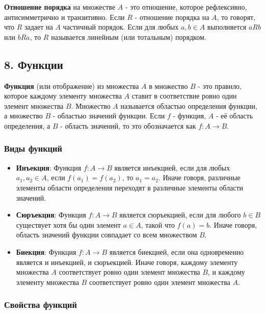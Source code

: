 \documentclass{article}
\begin{document}
\textbf{Отношение порядка} на множестве \( A \) - это отношение, которое рефлексивно, антисимметрично и транзитивно. Если \( R \) - отношение порядка на \( A \), то говорят, что \( R \) задает на \( A \) частичный порядок. Если для любых \( a, b \in A \) выполняется \( a R b \) или \( b R a \), то \( R \) называется линейным (или тотальным) порядком.

\subsection*{8. Функции}

\textbf{Функция} (или отображение) из множества \( A \) в множество \( B \) - это правило, которое каждому элементу множества \( A \) ставит в соответствие ровно один элемент множества \( B \). Множество \( A \) называется областью определения функции, а множество \( B \) - областью значений функции. Если \( f \) - функция, \( A \) - её область определения, а \( B \) - область значений, то это обозначается как \( f: A \to B \).

\subsubsection*{Виды функций}
\begin{itemize}
    \item \textbf{Инъекция}: Функция \( f: A \to B \) является инъекцией, если для любых \( a_1, a_2 \in A \), если \( f(a_1) = f(a_2) \), то \( a_1 = a_2 \). Иначе говоря, различные элементы области определения переходят в различные элементы области значений.
    
    \item \textbf{Сюръекция}: Функция \( f: A \to B \) является сюръекцией, если для любого \( b \in B \) существует хотя бы один элемент \( a \in A \), такой что \( f(a) = b \). Иначе говоря, область значений функции совпадает со всем множеством \( B \).
    
    \item \textbf{Биекция}: Функция \( f: A \to B \) является биекцией, если она одновременно является и инъекцией, и сюръекцией. Иначе говоря, каждому элементу множества \( A \) соответствует ровно один элемент множества \( B \), и каждому элементу множества \( B \) соответствует ровно один элемент множества \( A \).
\end{itemize}

\subsubsection*{Свойства функций}
\end{document}
